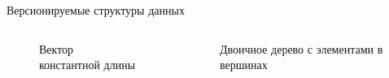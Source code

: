 \begin{frame}[fragile]{Версионируемые структуры данных}
  \begin{columns}[b]
    \begin{column}{0.45\textwidth}
      \begin{figure}
        \centering
        \caption{Вектор константной длины}
      \end{figure}
    \end{column}
    
    \begin{column}{0.45\textwidth}
      \begin{figure}
        \centering
        \caption{Двоичное дерево с элементами в вершинах}
      \end{figure}
    \end{column}
  \end{columns}
\end{frame}
